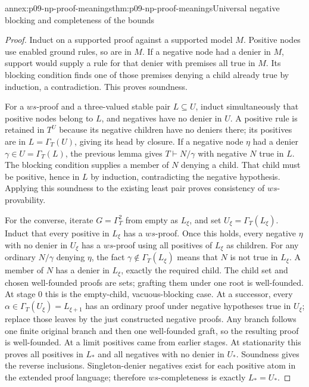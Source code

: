 \begin{annexitem}{annex:p09-np-proof-meanings}{thm:p09-np-proof-meanings}{Universal negative blocking and completeness of the bounds}
\begin{proof}
Induct on a supported proof against a supported model \(M\).
Positive nodes use enabled ground rules, so are in \(M\).
If a negative node had a denier in \(M\), support would supply
a rule for that denier with premises all true in \(M\). Its
blocking condition finds one of those premises denying a child
already true by induction, a contradiction. This proves soundness.

For a \(ws\)-proof and a three-valued stable pair \(L\subseteq U\),
induct simultaneously that positive nodes belong to \(L\), and
negatives have no denier in \(U\). A positive rule is retained
in \(T^U\) because its negative children have no deniers there;
its positives are in \(L=\Gamma_T(U)\), giving its head by
closure. If a negative node \(\eta\) had a denier
\(\gamma\in U=\Gamma_T(L)\), the previous lemma gives
\(T\vdash N/\gamma\) with negative \(N\) true in \(L\).
The blocking condition supplies a member of \(N\) denying a
child. That child must be positive, hence in \(L\) by induction,
contradicting the negative hypothesis. Applying this soundness to
the existing least pair proves consistency of \(ws\)-provability.

For the converse, iterate \(G=\Gamma_T^2\) from empty as
\(L_\xi\), and set \(U_\xi=\Gamma_T(L_\xi)\). Induct
that every positive in \(L_\xi\) has a \(ws\)-proof.
Once this holds, every negative \(\eta\) with no denier in
\(U_\xi\) has a \(ws\)-proof using all positives of
\(L_\xi\) as children. For any ordinary \(N/\gamma\)
denying \(\eta\), the fact
\(\gamma\notin\Gamma_T(L_\xi)\) means that \(N\) is
not true in \(L_\xi\). A member of \(N\) has a denier
in \(L_\xi\), exactly the required child. The child set and
chosen well-founded proofs are sets; grafting them under one root
is well-founded. At stage 0 this is the empty-child, vacuous-blocking
case. At a successor, every
\(\alpha\in\Gamma_T(U_\xi)=L_{\xi+1}\) has an ordinary
proof under negative hypotheses true in \(U_\xi\); replace
those leaves by the just constructed negative proofs. Any branch
follows one finite original branch and then one well-founded graft,
so the resulting proof is well-founded. At a limit positives came
from earlier stages. At stationarity this proves all positives in
\(L_*\) and all negatives with no denier in \(U_*\).
Soundness gives the reverse inclusions. Singleton-denier negatives
exist for each positive atom in the extended proof language;
therefore \(ws\)-completeness is exactly \(L_*=U_*\).
\end{proof}
\end{annexitem}

